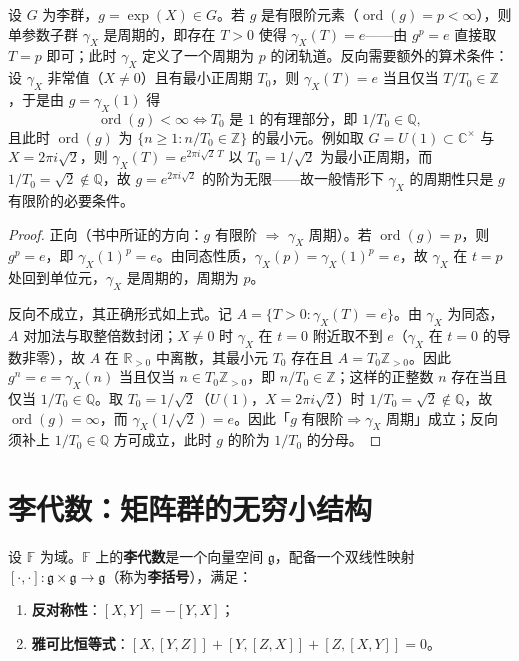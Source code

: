 \begin{proposition}[李群的有限阶元素与闭轨道]\label{prop:lie_group_finite_order}
设 $G$ 为李群，$g = \exp(X) \in G$。若 $g$ 是有限阶元素（$\operatorname{ord}(g) = p < \infty$），则单参数子群 $\gamma_X$ 是周期的，即存在 $T > 0$ 使得 $\gamma_X(T) = e$——由 $g^p=e$ 直接取 $T=p$ 即可；此时 $\gamma_X$ 定义了一个周期为 $p$ 的闭轨道。反向需要额外的算术条件：设 $\gamma_X$ 非常值（$X\ne0$）且有最小正周期 $T_0$，则 $\gamma_X(T)=e$ 当且仅当 $T/T_0\in\mathbb{Z}$，于是由 $g=\gamma_X(1)$ 得
\[
\operatorname{ord}(g)<\infty \iff T_0 \text{ 是 } 1 \text{ 的有理部分，即 } 1/T_0\in\mathbb{Q},
\]
且此时 $\operatorname{ord}(g)$ 为 $\{n\ge1: n/T_0\in\mathbb{Z}\}$ 的最小元。例如取 $G=U(1)\subset\mathbb{C}^\times$ 与 $X=2\pi i\sqrt2$，则 $\gamma_X(T)=e^{2\pi i\sqrt2\,T}$ 以 $T_0=1/\sqrt2$ 为最小正周期，而 $1/T_0=\sqrt2\notin\mathbb{Q}$，故 $g=e^{2\pi i\sqrt2}$ 的阶为无限——故一般情形下 $\gamma_X$ 的周期性只是 $g$ 有限阶的必要条件。
\end{proposition}

\begin{proof}
正向（书中所证的方向：$g$ 有限阶 $\Rightarrow$ $\gamma_X$ 周期）。若 $\operatorname{ord}(g) = p$，则 $g^p = e$，即 $\gamma_X(1)^p = e$。由同态性质，$\gamma_X(p) = \gamma_X(1)^p = e$，故 $\gamma_X$ 在 $t = p$ 处回到单位元，$\gamma_X$ 是周期的，周期为 $p$。

反向不成立，其正确形式如上式。记 $A=\{T>0:\gamma_X(T)=e\}$。由 $\gamma_X$ 为同态，$A$ 对加法与取整倍数封闭；$X\ne0$ 时 $\gamma_X$ 在 $t=0$ 附近取不到 $e$（$\gamma_X$ 在 $t=0$ 的导数非零），故 $A$ 在 $\mathbb{R}_{>0}$ 中离散，其最小元 $T_0$ 存在且 $A=T_0\mathbb{Z}_{>0}$。因此 $g^n=e=\gamma_X(n)$ 当且仅当 $n\in T_0\mathbb{Z}_{>0}$，即 $n/T_0\in\mathbb{Z}$；这样的正整数 $n$ 存在当且仅当 $1/T_0\in\mathbb{Q}$。取 $T_0=1/\sqrt2$（$U(1)$，$X=2\pi i\sqrt2$）时 $1/T_0=\sqrt2\notin\mathbb{Q}$，故 $\operatorname{ord}(g)=\infty$，而 $\gamma_X(1/\sqrt2)=e$。因此「$g$ 有限阶$\Rightarrow\gamma_X$ 周期」成立；反向须补上 $1/T_0\in\mathbb{Q}$ 方可成立，此时 $g$ 的阶为 $1/T_0$ 的分母。
\end{proof}

\section{\texorpdfstring{李代数：矩阵群的无穷小结构}{李代数：矩阵群的无穷小结构}}

\begin{definition}[李代数]\label{def:lie_algebra}
设 $\mathbb{F}$ 为域。$\mathbb{F}$ 上的\textbf{李代数}是一个向量空间 $\mathfrak{g}$，配备一个双线性映射 $[\cdot, \cdot]: \mathfrak{g} \times \mathfrak{g} \to \mathfrak{g}$（称为\textbf{李括号}），满足：
\begin{enumerate}[label=(\roman*)]
    \item \textbf{反对称性}：$[X, Y] = -[Y, X]$；
    \item \textbf{雅可比恒等式}：$[X, [Y, Z]] + [Y, [Z, X]] + [Z, [X, Y]] = 0$。
\end{enumerate}
\end{definition}

